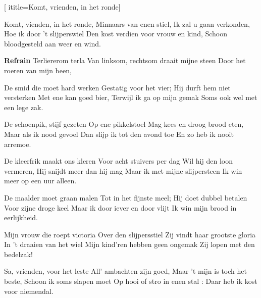  [
ititle={Komt, vrienden, in het ronde}]

\beginverse
Komt, vienden, in het ronde,
Minnaars van enen stiel,
Ik zal u gaan verkonden,
Hoe ik door 't slijperswiel
Den kost verdien voor vrouw en kind,
Schoon bloodgesteld aan weer en wind.
\endverse

\beginchorus
\textbf{Refrain}
Terliererom terla
Van linksom, rechtsom draait mijne steen
Door het roeren van mijn been,
\endchorus

\beginverse
De smid die moet hard werken
Gestatig voor het vier;
Hij durft hem niet versterken
Met ene kan goed bier,
Terwijl ik ga op mijn gemak
Soms ook wel met een lege zak.
\endverse

\beginverse
De schoenpik, stijf gezeten
Op ene pikkelstoel
Mag kees en droog brood eten,
Maar als ik nood gevoel
Dan slijp ik tot den avond toe
En zo heb ik nooit arremoe.
\endverse

\beginverse
De kleerfrik maakt ons kleren
Voor acht stuivers per dag
Wil hij den loon vermeren,
Hij snijdt meer dan hij mag
Maar ik met mijne slijpersteen
Ik win meer op een uur alleen.
\endverse

\beginverse
De maalder moet graan malen
Tot in het fijnste meel;
Hij doet dubbel betalen
Voor zijne droge keel
Maar ik door iever en door vlijt
Ik win mijn brood in eerlijkheid.
\endverse

\beginverse
Mijn vrouw die roept victoria
Over den slijpersstiel
Zij vindt haar grootste gloria
In 't draaien van het wiel
Mijn kind'ren hebben geen ongemak
Zij lopen met den bedelzak!
\endverse

\beginverse
Sa, vrienden, voor het leste
All' ambachten zijn goed,
Maar 't mijn is toch het beste,
Schoon ik soms slapen moet
Op hooi of stro in enen stal :
Daar heb ik kost voor niemendal.
\endverse
\endsong